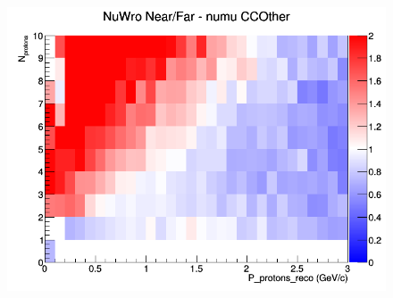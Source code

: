 \begin{figure}[h]
\endminipage
{}
\includegraphics[width=\linewidth]{eff_N_P/GAr/protons/ratios/CCOther_NuWro_numu_NF_N_P.png}
\endminipage
\newline
\end{figure}
\clearpage
